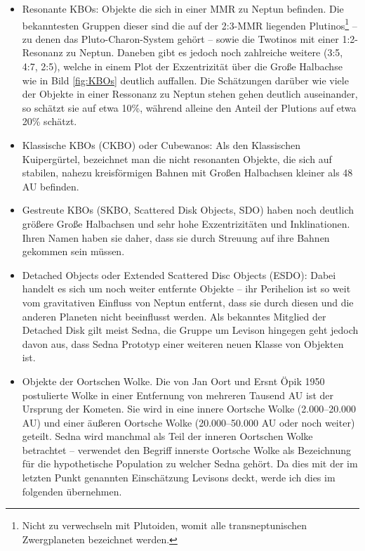 \documentclass[12pt,a4paper,twoside]{article}
\renewcommand{\cite}{\citep}
\begin{document}
\begin{itemize}
\item Resonante KBOs: Objekte die sich in einer MMR zu Neptun befinden. Die bekanntesten Gruppen dieser sind die auf der 2:3-MMR liegenden Plutinos\footnote{Nicht zu verwechseln mit Plutoiden, womit alle transneptunischen Zwergplaneten bezeichnet werden.} -- zu denen das Pluto-Charon-System gehört -- sowie die Twotinos mit einer 1:2-Resonanz zu Neptun. Daneben gibt es jedoch noch zahlreiche weitere (3:5, 4:7, 2:5), welche in einem Plot der Exzentrizität über die Große Halbachse wie in Bild \ref{fig:KBOs} deutlich auffallen\cite{Levison2008}.
Die Schätzungen darüber wie viele der Objekte in einer Ressonanz zu Neptun stehen gehen deutlich auseinander, 
so schätzt sie \cite{Trujillo2001,Levison2008} auf etwa 10\%, während \cite{Kavelaars2008,Levison2008} alleine den Anteil der Plutions auf etwa 20\% schätzt.
\item Klassische KBOs (CKBO) oder Cubewanos: Als den Klassischen Kuipergürtel, bezeichnet man die nicht resonanten Objekte, die sich auf stabilen, nahezu kreisförmigen Bahnen mit Großen Halbachsen kleiner als 48 AU befinden.
\item Gestreute KBOs (SKBO, Scattered Disk Objects, SDO) haben noch deutlich größere Große Halbachsen und sehr hohe Exzentrizitäten und Inklinationen. Ihren Namen haben sie daher, dass sie durch Streuung auf ihre Bahnen gekommen sein müssen.
\item Detached Objects oder Extended Scattered Disc Objects (ESDO): Dabei handelt es sich um noch weiter entfernte Objekte -- ihr Perihelion ist so weit vom gravitativen Einfluss von Neptun entfernt, dass sie durch diesen und die anderen Planeten nicht beeinflusst werden. Als bekanntes Mitglied der Detached Disk gilt meist Sedna, die Gruppe um Levison hingegen geht jedoch davon aus, dass Sedna Prototyp einer weiteren neuen Klasse von Objekten ist\cite{Morbidelli2004,Kenyon2004,Brasser2006,Levison2008}.
\item Objekte der Oortschen Wolke. Die von Jan Oort und Ersnt Öpik 1950 postulierte Wolke in einer Entfernung von mehreren Tausend AU ist der Ursprung der Kometen. Sie wird in eine innere Oortsche  Wolke (2.000–20.000 AU) und einer äußeren Oortsche Wolke (20.000–50.000 AU oder noch weiter) geteilt. Sedna wird manchmal als Teil der inneren Oortschen Wolke betrachtet – \cite{Brasser2008} verwendet den Begriff innerste Oortsche Wolke als Bezeichnung für die hypothetische Population zu welcher Sedna gehört. Da dies mit der im letzten Punkt genannten Einschätzung Levisons deckt, werde ich dies im folgenden übernehmen.
\end{itemize}
\end{document}
